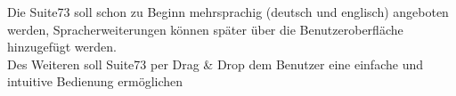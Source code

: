 Die Suite73 soll schon zu Beginn mehrsprachig (deutsch und englisch) angeboten werden, Spracherweiterungen können später über die Benutzeroberfläche hinzugefügt werden.\\
Des Weiteren soll Suite73 per Drag \& Drop dem Benutzer eine einfache und intuitive Bedienung ermöglichen